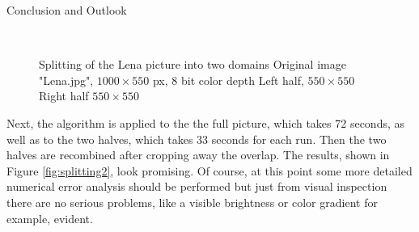 \begin{chapter}{Conclusion and Outlook}
\begin{figure}[h!]
    \centering
    \\
    \caption[Splitting the image domain]{Splitting of the Lena picture into two domains
	 Original image "Lena.jpg", $1000\times 550$ px, 8 bit color depth
	 Left half, $550\times 550$
	 Right half $550\times 550$
	\label{fig:splitting1}
    }
\end{figure}
Next, the algorithm is applied to the the full picture, which takes 72 seconds, as well as to the two halves, which takes 
33 seconds for each run. Then the two halves are recombined after cropping away the overlap. The results, shown in
Figure \ref{fig:splitting2}, look promising. Of course, at this point some more detailed numerical error analysis
should be performed but just from visual inspection there are no serious problems, like a visible brightness or color gradient for example, evident.\\


\end{chapter}
